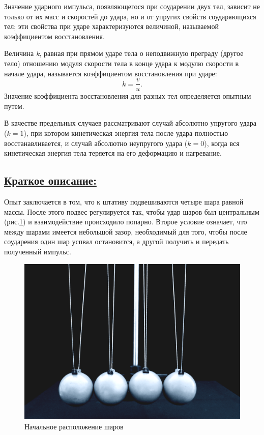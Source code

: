 \documentclass[14pt,a4paper,oneside]{extarticle}	%
\begin{document}
Значение ударного импульса, появляющегося при соударении двух тел, зависит не только от их масс и скоростей до удара, но и от упругих свойств соударяющихся тел; эти свойства при ударе характеризуются величиной, называемой коэффициентом восстановления.

Величина \textit{k}, равная при прямом ударе тела о неподвижную преграду (другое тело) отношению модуля
скорости тела в конце удара к модулю скорости в начале удара, называется коэффициентом восстановления при ударе:
$$
k = \frac{v}{u}.
$$
Значение коэффициента восстановления для разных тел определяется опытным путем.

В качестве предельных случаев рассматривают случай абсолютно упругого удара ($ k=1 $), при котором кинетическая энергия тела после удара полностью восстанавливается, и случай абсолютно неупругого удара ($ k=0 $), когда вся кинетическая энергия тела теряется на его деформацию и нагревание.

\newpage
\subsection*{\underline{Краткое описание:}}

Опыт заключается в том, что к штативу подвешиваются четыре шара равной массы.
После этого подвес регулируется так, чтобы удар шаров был центральным (рис.\ref{impact-2}) и взаимодействие происходило попарно.
Второе условие означает, что между шарами имеется небольшой зазор, необходимый для того, чтобы после соударения один шар успвал остановится, а другой получить и передать полученный импульс.
\begin{figure}[H]
	\centering 	
	\includegraphics[width=0.9\linewidth]{impact-2.png}
	\caption{Начальное расположение шаров}
	\label{impact-2}
\end{figure}
\end{document}
